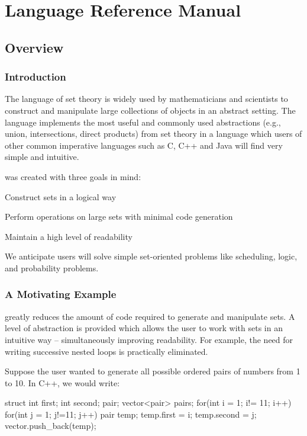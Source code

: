 \chapter{Language Reference Manual}
\section{Overview}
\subsection{Introduction}
The language of set theory is widely used by mathematicians and scientists to construct and manipulate large collections of objects in an abstract setting.  The \lang language implements the most useful and commonly used abstractions (e.g., union, intersections, direct products) from set theory in a language which users of other common imperative languages such as C, C++ and Java will find very simple and intuitive.

\lang was created with three goals in mind:
\begin{myNumList}
	\item Construct sets in a logical way
	\item Perform operations on large sets with minimal code generation 
	\item Maintain a high level of readability
\end{myNumList}

We anticipate users will solve simple set-oriented problems like scheduling, logic, and probability problems.

\subsection{A Motivating Example}
\lang greatly reduces the amount of code required to generate and manipulate sets.  A level of abstraction is provided which allows the user to work with sets in an intuitive way -- simultaneously improving readability. For example, the need for writing successive nested loops is practically eliminated.

Suppose the user wanted to generate all possible ordered pairs of numbers from 1 to 10.  In C++, we would write:

\begin{code}
struct { int first; int second; } pair;
vector<pair> pairs;
for(int i = 1; i!= 11; i++){
    for(int j = 1; j!=11; j++){
		pair temp;
		temp.first = i;
		temp.second = j;        
        vector.push_back(temp); 
    }
}
\end{code}

